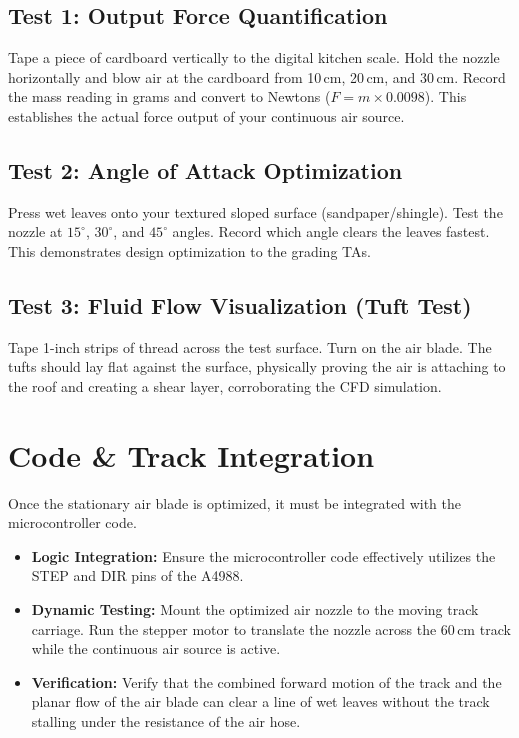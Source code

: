 \documentclass{article}
\begin{document}
\subsection{Test 1: Output Force Quantification}
Tape a piece of cardboard vertically to the digital kitchen scale. Hold the nozzle horizontally and blow air at the cardboard from 10\,cm, 20\,cm, and 30\,cm. Record the mass reading in grams and convert to Newtons ($F = m \times 0.0098$). This establishes the actual force output of your continuous air source.

\subsection{Test 2: Angle of Attack Optimization}
Press wet leaves onto your textured sloped surface (sandpaper/shingle). Test the nozzle at $15^\circ$, $30^\circ$, and $45^\circ$ angles. Record which angle clears the leaves fastest. This demonstrates design optimization to the grading TAs.

\subsection{Test 3: Fluid Flow Visualization (Tuft Test)}
Tape 1-inch strips of thread across the test surface. Turn on the air blade. The tufts should lay flat against the surface, physically proving the air is attaching to the roof and creating a shear layer, corroborating the CFD simulation.

\section{Code \& Track Integration}
Once the stationary air blade is optimized, it must be integrated with the microcontroller code.
\begin{itemize}
    \item \textbf{Logic Integration:} Ensure the microcontroller code effectively utilizes the STEP and DIR pins of the A4988. 
    \item \textbf{Dynamic Testing:} Mount the optimized air nozzle to the moving track carriage. Run the stepper motor to translate the nozzle across the 60\,cm track while the continuous air source is active.
    \item \textbf{Verification:} Verify that the combined forward motion of the track and the planar flow of the air blade can clear a line of wet leaves without the track stalling under the resistance of the air hose.
\end{itemize}
\end{document}

